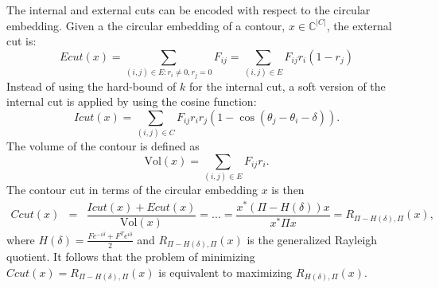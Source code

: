 \documentclass{SMBV12}
\begin{document}
The internal and external cuts can be encoded with respect to the circular embedding. Given a the circular embedding of a contour, $x \in \mathbb{C}^{\lvert C \rvert}$, the external cut is:
\begin{equation}
Ecut(x) = \sum\limits_{(i, j) \in E: r_i \neq 0, r_j = 0} F_{ij} = \sum\limits_{(i, j) \in E} F_{ij}r_i(1 - r_j)
\end{equation}
Instead of using the hard-bound of $k$ for the internal cut, a soft version of the internal cut is applied by using the cosine function:
\begin{equation}
Icut(x) = \sum\limits_{(i, j) \in C}F_{ij} r_ir_j(1 - \cos(\theta_j - \theta_i - \delta)).
\end{equation}
The volume of the contour is defined as
\begin{equation}
\mbox{Vol}(x) = \sum\limits_{(i, j) \in E}F_{ij}r_i.
\end{equation}
The contour cut in terms of the circular embedding $x$ is then
\begin{equation}
\begin{array}{lcl}
Ccut(x) & = & \dfrac{Icut(x) + Ecut(x)}{\mathrm{Vol}(x)} = ... = \dfrac{x^*(\Pi - H(\delta))x}{x^* \Pi x} = R_{\Pi - H(\delta), \Pi}(x),
\end{array}
\end{equation}
where $H(\delta) = \frac{Fe^{-i\delta} + F^Te^{i\delta}}{2}$ and $R_{\Pi - H(\delta), \Pi}(x)$ is the generalized Rayleigh quotient. It follows that the problem of minimizing $Ccut(x) = R_{\Pi - H(\delta), \Pi}(x)$ is equivalent to maximizing $R_{H(\delta), \Pi}(x)$.
\end{document}

